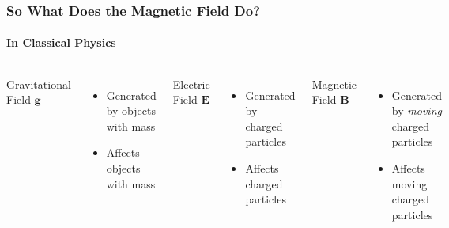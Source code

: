 \documentclass[12pt,aspectratio=169]{beamer}
\newcommand{\mb}[1]{\mathbf{#1}}
\begin{document}
\begin{frame}
  \frametitle{So What Does the Magnetic Field Do?}
  \framesubtitle{In Classical Physics}
  \begin{columns}
    \begin{center}
      Gravitational Field $\mb{g}$
    \end{center}
    \begin{itemize}
    \item Generated by objects with mass
    \item Affects objects with mass
    \end{itemize}

    \begin{center}
      Electric Field $\mb{E}$
    \end{center}
    \begin{itemize}
    \item Generated by charged particles
    \item Affects charged particles
    \end{itemize}

    \begin{center}
      Magnetic Field $\mb{B}$
    \end{center}
    \begin{itemize}
    \item Generated by \emph{moving} charged particles
    \item Affects moving charged particles
    \end{itemize}
  \end{columns}
\end{frame}
\end{document}
